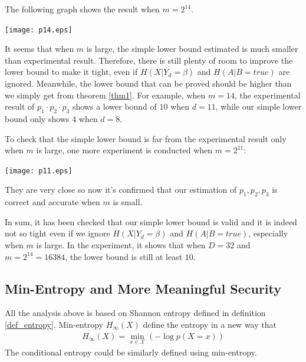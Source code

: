 \documentclass[10pt,a4paper]{article}
\begin{document}
		The following graph shows the result when $m = 2^{14}$.
		\begin{center}
			\texttt{[image: p14.eps]}
		\end{center}
		It seems that when $m$ is large, the simple lower bound
		estimated is much smaller than experimental result. Therefore,
		there is still plenty of room to improve the lower bound
		to make it tight, even if $H(X | Y_d = \beta)$ and $H(A | B = true)$ 
		are ignored. Meanwhile, the lower bound that can be proved should
		be higher than we simply get from theorem \ref{thm1}.
		For example, when $m = 14$, the experimental result
		of $p_1 \cdot p_2 \cdot p_3$ shows a lower bound of $10$
		when $d = 11$, while our simple lower bound only shows $4$
		when $d = 8$.
		
		To check that the simple lower bound is far from the experimental
		result only when $m$ is large, one more experiment is conducted
		when $m = 2^{11}$:
		\begin{center}
			\texttt{[image: p11.eps]}
		\end{center}
		They are very close so now it's confirmed that our estimation
		of $p_1, p_2, p_3$ is correct and accurate when $m$ is small.
		
		In sum, it has been checked that our simple lower bound
		is valid and it is indeed not so tight even if we ignore
		$H(X | Y_d = \beta)$ and $H(A | B = true)$, especially
		when $m$ is large. In the experiment,
		it shows that when $D = 32$ and $m = 2^{14} = 16384$, the lower bound
		is still at least $10$.

\subsection{Min-Entropy and More Meaningful Security}
	All the analysis above is based on Shannon entropy defined in definition \ref{def_entropy}.
	Min-entropy $H_\infty(X)$ define the entropy in a new way that
	\begin{align*}
		H_\infty(X) = \min_{x \in \mathcal X} \left(-\log p\left(X = x\right) \right)
	\end{align*}
	The conditional entropy could be similarly defined using min-entropy.
	
\end{document}
